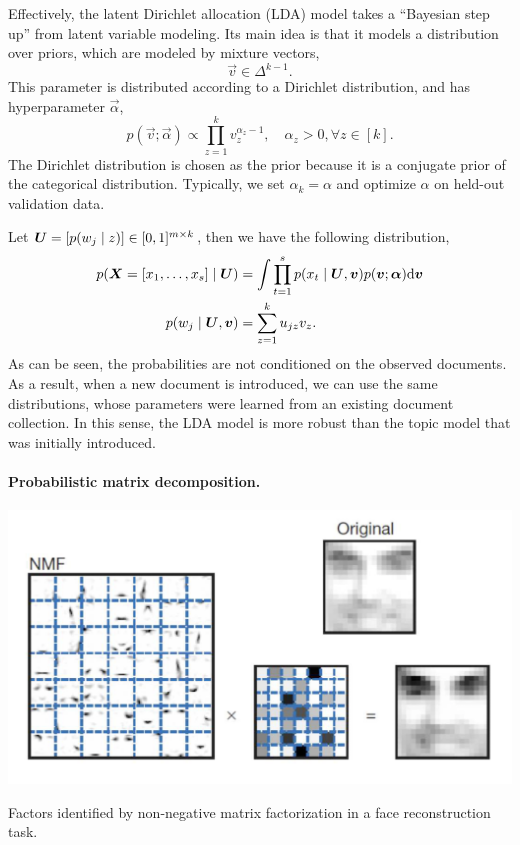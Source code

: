 Effectively, the latent Dirichlet allocation (LDA) model takes a ``Bayesian step up'' from latent
variable modeling. Its main idea is that it models a distribution over priors, which are modeled by
mixture vectors, \[
    \vec{v} \in \Delta^{k-1}.
\]
This parameter is distributed according to a Dirichlet distribution, and has hyperparameter
$\vec{\alpha}$, \[
    p(\vec{v}; \vec{\alpha}) \propto \prod_{z=1}^{k} v_z^{\alpha_z - 1}, \quad \alpha_z > 0, \forall z \in [k].
\]
The Dirichlet distribution is chosen as the prior because it is a conjugate prior of the
categorical distribution. Typically, we set $\alpha_k = \alpha$ and optimize $\alpha$ on held-out
validation data.

Let $\bm{U} = [p(w_j \mid z)] \in [0,1]^{m \times k}$, then we have the following distribution,
\begin{align*}
    p(\bm{X}=[x_1, \ldots, x_s] \mid \bm{U}) & = \int \prod_{t=1}^{s} p(x_t \mid \bm{U}, \bm{v}) p(\bm{v}; \bm{\alpha}) \mathrm{d}\bm{v} \\
    p(w_j \mid \bm{U}, \bm{v})               & = \sum_{z=1}^{k} u_{jz} v_z.
\end{align*}
As can be seen, the probabilities are not conditioned on the observed documents. As a result, when a
new document is introduced, we can use the same distributions, whose parameters were learned from an
existing document collection. In this sense, the LDA model is more robust than the topic model that
was initially introduced.

\paragraph{Probabilistic matrix decomposition.}

\begin{marginfigure}
    \centering
    \includegraphics[width=\textwidth]{figures/nmf_face}
    \caption{Factors identified by non-negative matrix factorization in a face reconstruction task.}
    \label{fig:nmf}
\end{marginfigure}

